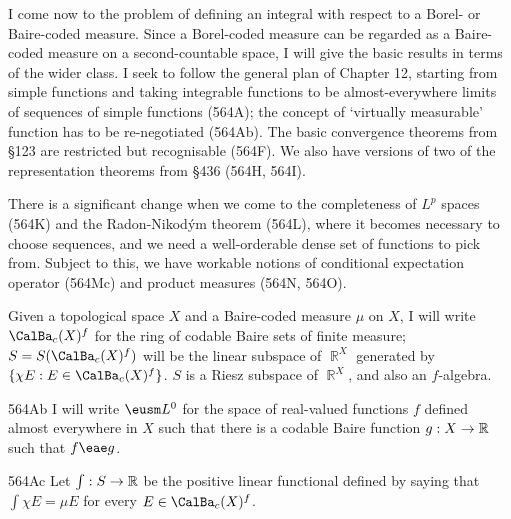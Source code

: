 
\def\chaptername{Choice and determinacy}
\def\sectionname{Integration without choice}


I come now to the problem
of defining an integral with respect to a Borel- or Baire-coded measure.
Since a Borel-coded measure can be regarded as a Baire-coded measure on a
second-countable space,
I will give the basic results in terms of the wider class.
I seek to follow the general plan of Chapter 12, starting from simple
functions and taking integrable functions to be almost-everywhere
limits of sequences of simple functions (564A);  the concept of
`virtually measurable' function has to be re-negotiated (564Ab).   The
basic convergence theorems from \S123 are restricted but recognisable
(564F).   We also have versions of two of the
representation theorems from \S436 (564H, 564I).

There is a significant change when we come to the completeness of
$L^p$ spaces (564K) and the Radon-Nikod\'ym theorem (564L),
where it becomes necessary to
choose sequences, and we need a well-orderable dense set of functions to
pick from.   Subject to this, we have workable notions of conditional
expectation operator (564Mc) and product measures (564N, 564O).

 Given a topological space $X$ and a
Baire-coded measure $\mu$ on $X$, I will write
$\CalBa_c(X)^f$ for
the ring of codable Baire sets of finite measure;  $S=S(\CalBa_c(X)^f)$
will be the linear subspace of $\BbbR^X$ generated by
$\{\chi E:E\in\CalBa_c(X)^f\}$.
$S$ is a Riesz subspace of $\BbbR^X$, and also an
$f$-algebra.

\spheader 564Ab I will write $\eusm L^0$
for the space of real-valued functions $f$ defined almost
everywhere in $X$ such that there is a codable Baire function
$g:X\to\Bbb R$ such that $f\eae g$.

\spheader 564Ac Let $\int:S\to\Bbb R$ be the
positive linear functional defined by
saying that $\int\chi E=\mu E$ for every $E\in\CalBa_c(X)^f$.

